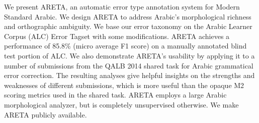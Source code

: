 We present ARETA, an automatic error type annotation system for Modern Standard Arabic.  We design ARETA to address Arabic's morphological richness and orthographic ambiguity. We base our error taxonomy on the Arabic Learner Corpus (ALC) Error Tagset with some modifications. ARETA achieves a performance of  85.8\% (micro average F1 score) on a manually annotated blind test portion of ALC. We also demonstrate ARETA's usability by applying it to a number of submissions from the QALB 2014 shared task for Arabic grammatical error correction.  The resulting analyses give helpful insights on the strengths and weaknesses of different submissions, which is more useful than the opaque M2 scoring metrics used in the shared task. ARETA employs a large Arabic morphological analyzer, but is completely unsupervised otherwise. We make ARETA publicly available.
